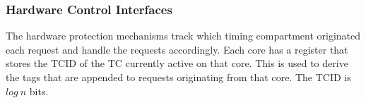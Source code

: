 


\subsubsection{Hardware Control Interfaces}



The hardware protection mechanisms track which timing compartment originated 
each request and handle the requests accordingly. Each core has a register that 
stores the TCID of the TC currently active on that core. This is used to derive 
the tags that are appended to requests originating from that core. The TCID is 
$log\ n$ bits. 

